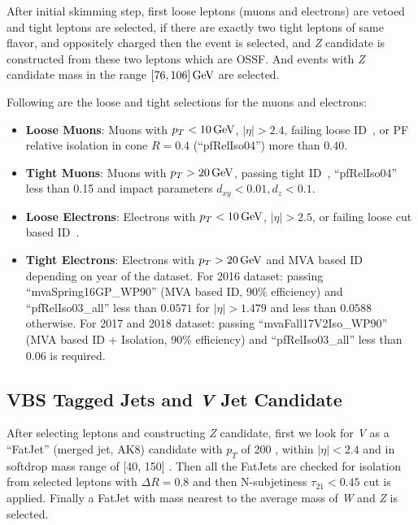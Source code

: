 After initial skimming step, first loose leptons (muons and electrons) are vetoed
and tight leptons are selected, if there are exactly two tight leptons
of same flavor, and oppositely charged then the event is selected,
and \textit{Z} candidate is constructed from these two leptons which are \gls{OSSF}.
And events with \textit{Z} candidate mass in the range \( [76, 106] \,\text{Ge\hspace{-.08em}V}{} \) are selected.

Following are the loose and tight selections for the muons and electrons:
\begin{itemize}
  \item \textbf{Loose Muons}: Muons with \( p_T < 10 \,\text{Ge\hspace{-.08em}V}{} \), \( |\eta| > 2.4 \),
        failing loose ID~\cite{cms-muon-id}, or \gls{PF} relative isolation in cone \( R = 0.4 \) (``pfRelIso04'') more than
        \( 0.40 \).
  \item \textbf{Tight Muons}: Muons with \( p_T > 20 \,\text{Ge\hspace{-.08em}V}{} \), passing
        tight ID~\cite{cms-muon-id}, ``pfRelIso04'' less than 0.15 and
        impact parameters \( d_{xy} < 0.01, d_z < 0.1 \).
  \item \textbf{Loose Electrons}: Electrons with \( p_T < 10 \,\text{Ge\hspace{-.08em}V}{} \),
        \( |\eta| > 2.5 \),
        or failing loose cut based ID~\cite{cms-egamma-id}.
  \item \textbf{Tight Electrons}: Electrons with \( p_T > 20 \,\text{Ge\hspace{-.08em}V} \)
        and MVA based ID depending on year of the dataset.
        For 2016 dataset: passing ``mvaSpring16GP\_WP90'' (MVA based ID, 90\% efficiency)
        and ``pfRelIso03\_all'' less than \( 0.0571 \) for
        \( |\eta| > 1.479 \) and less than \( 0.0588 \) otherwise.
        For 2017 and 2018 dataset: passing ``mvaFall17V2Iso\_WP90''
        (MVA based ID + Isolation, 90\% efficiency) and ``pfRelIso03\_all''
        less than \( 0.06 \) is required.
\end{itemize}

\subsection{
  VBS Tagged Jets and \textit{V} Jet Candidate
}
After selecting leptons and constructing \textit{Z} candidate, first we look
for \textit{V} as a ``FatJet'' (merged jet, AK8) candidate with \( p_T \) of 200 \GeV{},
within \( |\eta| < 2.4 \) and in softdrop mass range of [40, 150] \GeV{}.
Then all the FatJets are checked for isolation from
selected leptons with \( \Delta R = 0.8 \)
and then N-subjetiness \( \tau_{21} < 0.45 \) cut is applied.
Finally a FatJet with mass nearest to the average mass of \textit{W} and \textit{Z}
is selected.

